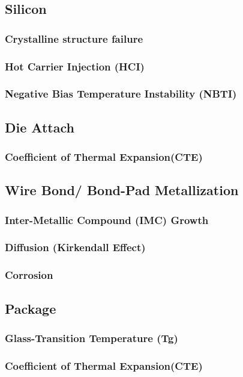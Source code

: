 \documentclass{article}
\begin{document}
	
	\subsection{Silicon}
		\subsubsection{Crystalline structure failure}
		\subsubsection{Hot Carrier Injection (HCI)}
		\subsubsection{Negative Bias Temperature Instability (NBTI)}
	
	\subsection{Die Attach}
		\subsubsection{Coefficient of Thermal Expansion(CTE)}
	
	\subsection{Wire Bond/ Bond-Pad Metallization}
		\subsubsection{Inter-Metallic Compound (IMC) Growth}
		\subsubsection{Diffusion (Kirkendall Effect)}
		\subsubsection{Corrosion}
	
	\subsection{Package}
		\subsubsection{Glass-Transition Temperature (Tg)}
		\subsubsection{Coefficient of Thermal Expansion(CTE)}
\end{document}
